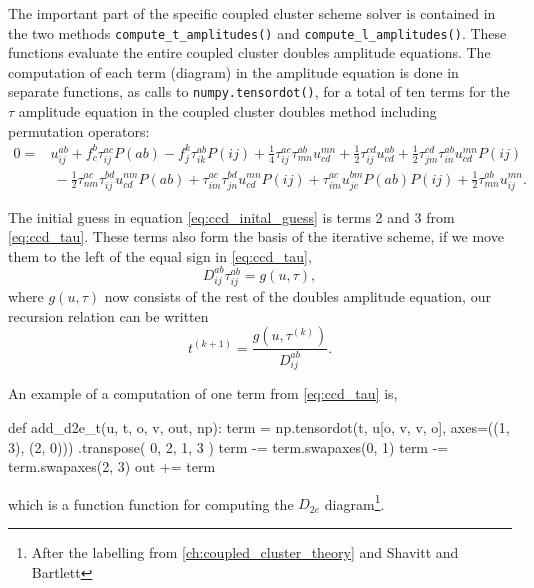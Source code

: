     The important part of the specific coupled cluster scheme solver is contained in the two 
    methods \lstinline{compute_t_amplitudes()} and \lstinline{compute_l_amplitudes()}.
    These functions evaluate the entire coupled cluster doubles amplitude equations.
    The computation of each term (diagram) in the amplitude equation is done in separate functions,
    as calls to \lstinline{numpy.tensordot()}, for a total of ten terms for the 
    $\tau$ amplitude equation in the coupled cluster doubles method including 
    permutation operators:
    \begin{equation}
        \label{eq:ccd_tau}
        \begin{aligned}
        0 =& u^{ab}_{ij} + f^b_c \tau^{ac}_{ij}P(ab) 
            - f^k_j \tau^{ab}_{ik}P(ij)
            + \frac{1}{4} \tau^{ac}_{ij} \tau^{ab}_{mn}u^{mn}_{cd} 
            + \frac{1}{2} \tau^{cd}_{ij}u^{ab}_{cd}
            + \frac{1}{2} \tau^{cd}_{jm} \tau^{ab}_{in} u^{mn}_{cd}P(ij) \\
            &\ - \frac{1}{2} \tau^{ac}_{nm} \tau^{bd}_{ij} u^{nm}_{cd}P(ab)
            + \tau^{ac}_{im} \tau^{bd}_{jn}u^{mn}_{cd}P(ij)
            + \tau^{ac}_{im}u^{bm}_{jc}P(ab)P(ij)
            + \frac{1}{2} \tau^{ab}_{mn}u^{mn}_{ij}.
        \end{aligned}
    \end{equation}

    The initial guess in equation \autoref{eq:ccd_inital_guess} is terms 2 and 3
    from \autoref{eq:ccd_tau}. These terms also form the basis of the iterative scheme,
    if we move them to the left of the equal sign in \autoref{eq:ccd_tau}, 
    \begin{equation}
        D^{ab}_{ij} \tau^{ab}_{ij} = g(u, \tau),
    \end{equation}
    where $g(u, \tau)$ now consists of the rest of the doubles amplitude equation, our 
    recursion relation can be written
    \begin{equation}
        t^{(k+1)} = \frac{g(u,\tau^{(k)})}{D^{ab}_{ij}}.
    \end{equation}

    An example of a computation of one term from \autoref{eq:ccd_tau} is,
    \begin{python}
    def add_d2e_t(u, t, o, v, out, np):
        term = np.tensordot(t, u[o, v, v, o], axes=((1, 3), (2, 0)))
            .transpose(
                0, 2, 1, 3
        )
        term -= term.swapaxes(0, 1)
        term -= term.swapaxes(2, 3)
        out += term
    \end{python}
    which is a function function for computing the $D_{2e}$ diagram\footnote{After the labelling from 
    \autoref{ch:coupled_cluster_theory} and Shavitt and Bartlett\cite{shavitt2009many}}.

